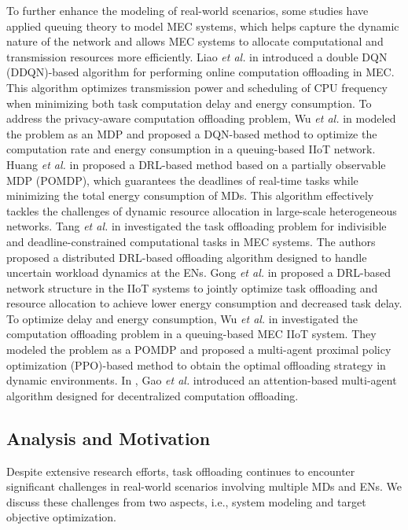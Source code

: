 \documentclass[12pt,draftclsnofoot,onecolumn]{IEEEtran}
\begin{document}
		
		To further enhance the modeling of real-world scenarios, some studies have applied queuing theory to model MEC systems, which helps capture the dynamic nature of the network and allows MEC systems to allocate computational and transmission resources more efficiently.
		Liao \textit{et al.} in \cite{liao2023online} introduced a double DQN (DDQN)-based algorithm for performing online computation offloading in MEC. This algorithm optimizes transmission power and scheduling of CPU frequency when minimizing both task computation delay and energy consumption. 
		To address the privacy-aware computation offloading problem, Wu \textit{et al.} in \cite{wu2024combining} modeled the problem as an MDP and proposed a DQN-based method to optimize the computation rate and energy consumption in a queuing-based IIoT network.
		Huang \textit{et al.} in \cite{huang2021deadline} proposed a DRL-based method based on a partially observable MDP (POMDP), which guarantees the deadlines of real-time tasks while minimizing the total energy consumption of MDs. This algorithm effectively tackles the challenges of dynamic resource allocation in large-scale heterogeneous networks. 
		Tang \textit{et al.} in \cite{9253665} investigated the task offloading problem for indivisible and deadline-constrained computational tasks in MEC systems. The authors proposed a distributed DRL-based offloading algorithm designed to handle uncertain workload dynamics at the ENs. 
		Gong \textit{et al.} in \cite{gong2022edge} proposed a DRL-based network structure in the IIoT systems to jointly optimize task offloading and resource allocation to achieve lower energy consumption and decreased task delay.
		To optimize delay and energy consumption, Wu \textit{et al.} in \cite{wu2023multi} investigated the computation offloading problem in a queuing-based MEC IIoT system. They modeled the problem as a POMDP and proposed a multi-agent proximal policy optimization (PPO)-based method to obtain the optimal offloading strategy in dynamic environments.
		In \cite{gao2022large}, Gao \textit{et al.} introduced an attention-based multi-agent algorithm designed for decentralized computation offloading.

		\subsection{Analysis and Motivation}
		Despite extensive research efforts, task offloading continues to encounter significant challenges in real-world scenarios involving multiple MDs and ENs. We discuss these challenges from two aspects, i.e., system modeling and target objective optimization.
		
\end{document}
